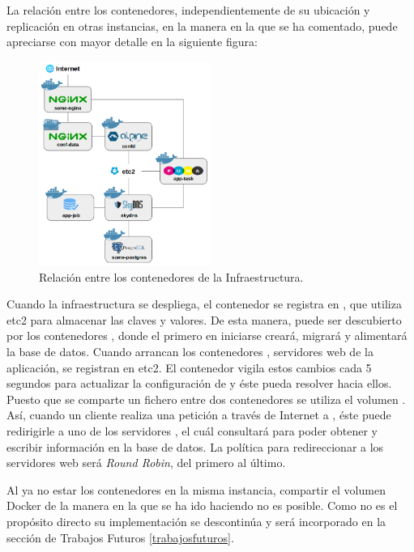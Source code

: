 La relación entre los contenedores, independientemente de su ubicación y replicación en otras instancias, en la manera en la que se ha comentado, puede apreciarse con mayor detalle en la siguiente figura:

\begin{figure}[H]
\centering
\includegraphics[width=0.5\textwidth]{images/figures/aws-2-iteration.png}
\caption{Relación entre los contenedores de la Infraestructura.}
\end{figure}

Cuando la infraestructura se despliega, el contenedor  se registra en , que utiliza etc2 para almacenar las claves y valores. De esta manera,  puede ser descubierto por los contenedores , donde el primero en iniciarse creará, migrará y alimentará la base de datos. Cuando arrancan los contenedores , servidores web de la aplicación, se registran en etc2. El contenedor  vigila estos cambios cada 5 segundos para actualizar la configuración de  y éste pueda resolver hacia ellos. Puesto que se comparte un fichero entre dos contenedores se utiliza el volumen . Así, cuando un cliente realiza una petición a través de Internet a , éste puede redirigirle a uno de los servidores , el cuál consultará  para poder obtener y escribir información en la base de datos. La política para redireccionar a los servidores web será \textit{Round Robin}, del primero al último.

Al ya no estar los contenedores en la misma instancia, compartir el volumen Docker  de la manera en la que se ha ido haciendo no es posible. Como no es el propósito directo su implementación se descontinúa y será incorporado en la sección de Trabajos Futuros \ref{trabajosfuturos}.

